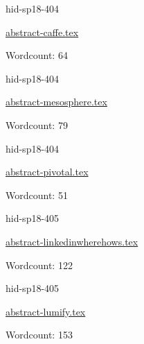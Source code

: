 

\begin{IU}

hid-sp18-404

\href{https://github.com/cloudmesh-community/hid-sp18-404/blob/master//technology/abstract-caffe.tex}{abstract-caffe.tex}

 

Wordcount: 64

\end{IU}



\begin{IU}

hid-sp18-404

\href{https://github.com/cloudmesh-community/hid-sp18-404/blob/master//technology/abstract-mesosphere.tex}{abstract-mesosphere.tex}

 

Wordcount: 79

\end{IU}



\begin{IU}

hid-sp18-404

\href{https://github.com/cloudmesh-community/hid-sp18-404/blob/master//technology/abstract-pivotal.tex}{abstract-pivotal.tex}

 

Wordcount: 51

\end{IU}



\begin{IU}

hid-sp18-405

\href{https://github.com/cloudmesh-community/hid-sp18-405/blob/master//technology/abstract-linkedinwherehows.tex}{abstract-linkedinwherehows.tex}

 

Wordcount: 122

\end{IU}



\begin{IU}

hid-sp18-405

\href{https://github.com/cloudmesh-community/hid-sp18-405/blob/master//technology/abstract-lumify.tex}{abstract-lumify.tex}

 

Wordcount: 153

\end{IU}

